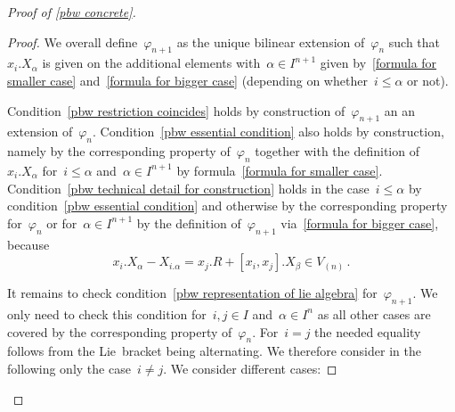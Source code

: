 \begin{proof}[Proof of \cref{pbw concrete}]
\begin{proof}
    We overall define~$\varphi_{n+1}$ as the unique bilinear extension of~$\varphi_n$ such that~$x_i.X_\alpha$ is given on the additional elements with~$\alpha \in I^{n+1}$ given by~\eqref{formula for smaller case} and~\eqref{formula for bigger case} (depending on whether~$i \leq \alpha$ or not).
    
    Condition~\ref*{pbw restriction coincides} holds by construction of~$\varphi_{n+1}$ an an extension of~$\varphi_n$.
    Condition~\ref*{pbw essential condition} also holds by construction, namely by the corresponding property of~$\varphi_n$ together with the definition of~$x_i.X_\alpha$ for~$i \leq \alpha$ and~$\alpha \in I^{n+1}$ by formula~\eqref{formula for smaller case}.
    Condition~\ref*{pbw technical detail for construction} holds in the case~$i \leq \alpha$ by condition~\ref*{pbw essential condition} and otherwise by the corresponding property for~$\varphi_n$ or for~$\alpha \in I^{n+1}$ by the definition of~$\varphi_{n+1}$ via~\eqref{formula for bigger case}, because
    \[
      x_i.X_\alpha - X_{i.\alpha}
      =
      x_j.R + [x_i, x_j].X_\beta
      \in
      V_{(n)} \,.
    \]
  
    It remains to check condition~\ref*{pbw representation of lie algebra} for~$\varphi_{n+1}$.
    We only need to check this condition for~$i,j \in I$ and~$\alpha \in I^n$ as all other cases are covered by the corresponding property of~$\varphi_n$.
    For~$i = j$ the needed equality follows from the Lie~bracket being alternating.
    We therefore consider in the following only the case~$i \neq j$.
    We consider different cases:
    

\end{proof}
\end{proof}
